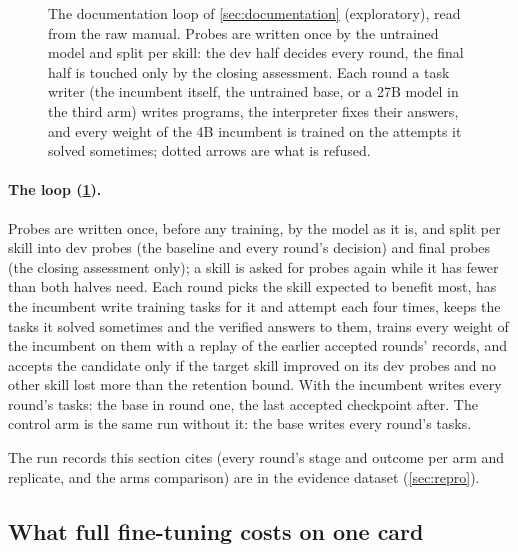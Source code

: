 \begin{figure}[tbp]
\caption{The documentation loop of \cref{sec:documentation} (exploratory), read from the raw manual.
Probes are written once by the untrained model and split per skill: the dev half decides every round,
the final half is touched only by the closing assessment. Each round a task writer (the incumbent
itself, the untrained base, or a 27B model in the third arm) writes programs, the interpreter fixes
their answers, and every weight of the 4B incumbent is trained on the attempts it solved sometimes;
dotted arrows are what is refused.}\label{fig:doc-loop}
\end{figure}

\paragraph{The loop (\cref{fig:doc-loop}).} Probes are written once, before any training, by the model as it
is, and split per skill into dev probes (the baseline and every round's decision) and
final probes (the closing assessment only); a skill is asked for probes again while it
has fewer than both halves need. Each round picks the skill expected to benefit
most, has the incumbent write training tasks for it and attempt each four times, keeps
the tasks it solved sometimes and the verified answers to them, trains every weight of
the incumbent on them with a replay of the earlier accepted rounds' records, and accepts
the candidate only if the target skill improved on its dev probes and no other skill
lost more than the retention bound. With  the incumbent writes
every round's tasks: the base in round one, the last accepted checkpoint after.
The control arm is the same run without it: the base writes every round's tasks.

The run records this section cites (every round's stage and outcome per arm and replicate, and the
arms comparison) are in the evidence dataset 
(\cref{sec:repro}).

\subsection{What full fine-tuning costs on one card}

